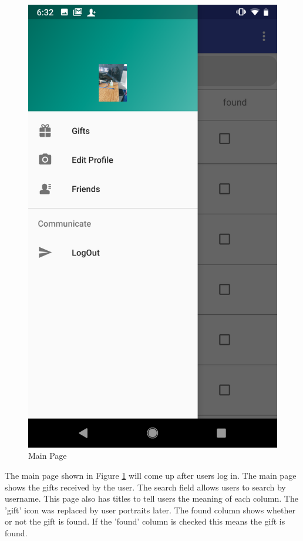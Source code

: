 \begin{figure}[H]
\begin{minipage}[t]{0.4\textwidth}
\includegraphics[width=.95\textwidth]{section03/assets/MainPortrait.png}
\subcaption{\label{FunctionsMainUI}}
\end{minipage}%
\caption[Main Page]{\label{MainPageUI}Main Page}
\end{figure}
\par The main page shown in Figure \ref{MainPageUI} will come up after users log in. The main page shows the gifts received by the user. The search field allows users to search by username. This page also has titles to tell users the meaning of each column. The 'gift' icon was replaced by user portraits later. The found column shows whether or not the gift is found. If the 'found' column is checked this means the gift is found.
